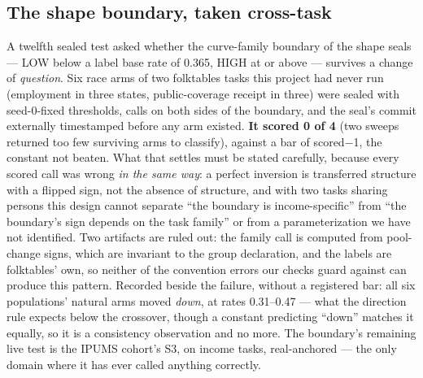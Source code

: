 \documentclass[9pt,conference]{IEEEtran}
\begin{document}
\subsection{The shape boundary, taken cross-task}
\label{sec:crosstask}

A twelfth sealed test asked whether the curve-family boundary of the shape seals --- LOW
below a label base rate of 0.365, HIGH at or above --- survives a change of
\emph{question}. Six race arms of two folktables tasks this project had never run
(employment in three states, public-coverage receipt in three) were sealed with
seed-0-fixed thresholds, calls on both sides of the boundary, and the seal's commit
externally timestamped before any arm existed. \textbf{It scored 0 of 4} (two sweeps
returned too few surviving arms to classify), against a bar of scored$-$1, the constant
not beaten. What that settles must be stated carefully, because every scored call was
wrong \emph{in the same way}: a perfect inversion is transferred structure with a
flipped sign, not the absence of structure, and with two tasks sharing persons this
design cannot separate ``the boundary is income-specific'' from ``the boundary's sign
depends on the task family'' or from a parameterization we have not identified. Two
artifacts are ruled out: the family call is computed from pool-change signs, which are
invariant to the group declaration, and the labels are folktables' own, so neither of
the convention errors our checks guard against can produce this pattern. Recorded
beside the failure, without a registered bar: all six populations' natural arms moved
\emph{down}, at rates 0.31--0.47 --- what the direction rule expects below the
crossover, though a constant predicting ``down'' matches it equally, so it is a
consistency observation and no more. The boundary's remaining live test is the IPUMS
cohort's S3, on income tasks, real-anchored --- the only domain where it has ever
called anything correctly.
\end{document}
